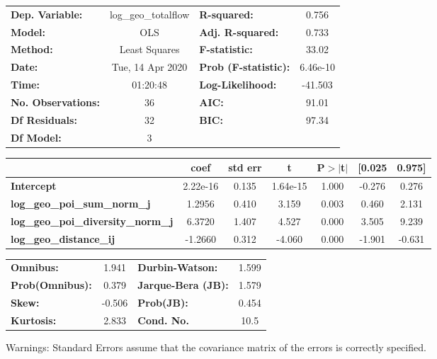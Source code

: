 \begin{center}
\begin{tabular}{lclc}
\toprule
\textbf{Dep. Variable:}                    & log\_geo\_totalflow & \textbf{  R-squared:         } &     0.756   \\
\textbf{Model:}                            &         OLS         & \textbf{  Adj. R-squared:    } &     0.733   \\
\textbf{Method:}                           &    Least Squares    & \textbf{  F-statistic:       } &     33.02   \\
\textbf{Date:}                             &   Tue, 14 Apr 2020  & \textbf{  Prob (F-statistic):} &  6.46e-10   \\
\textbf{Time:}                             &       01:20:48      & \textbf{  Log-Likelihood:    } &   -41.503   \\
\textbf{No. Observations:}                 &            36       & \textbf{  AIC:               } &     91.01   \\
\textbf{Df Residuals:}                     &            32       & \textbf{  BIC:               } &     97.34   \\
\textbf{Df Model:}                         &             3       & \textbf{                     } &             \\
\bottomrule
\end{tabular}
\begin{tabular}{lcccccc}
                                           & \textbf{coef} & \textbf{std err} & \textbf{t} & \textbf{P$> |$t$|$} & \textbf{[0.025} & \textbf{0.975]}  \\
\midrule
\textbf{Intercept}                         &     2.22e-16  &        0.135     &  1.64e-15  &         1.000        &       -0.276    &        0.276     \\
\textbf{log\_geo\_poi\_sum\_norm\_j}       &       1.2956  &        0.410     &     3.159  &         0.003        &        0.460    &        2.131     \\
\textbf{log\_geo\_poi\_diversity\_norm\_j} &       6.3720  &        1.407     &     4.527  &         0.000        &        3.505    &        9.239     \\
\textbf{log\_geo\_distance\_ij}            &      -1.2660  &        0.312     &    -4.060  &         0.000        &       -1.901    &       -0.631     \\
\bottomrule
\end{tabular}
\begin{tabular}{lclc}
\textbf{Omnibus:}       &  1.941 & \textbf{  Durbin-Watson:     } &    1.599  \\
\textbf{Prob(Omnibus):} &  0.379 & \textbf{  Jarque-Bera (JB):  } &    1.579  \\
\textbf{Skew:}          & -0.506 & \textbf{  Prob(JB):          } &    0.454  \\
\textbf{Kurtosis:}      &  2.833 & \textbf{  Cond. No.          } &     10.5  \\
\bottomrule
\end{tabular}
\end{center}

Warnings: \newline
 [1] Standard Errors assume that the covariance matrix of the errors is correctly specified.